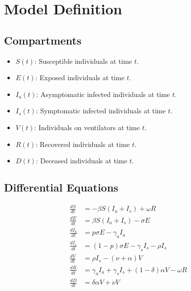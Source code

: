 \documentclass[lettersize, journal]{IEEEtran}
\begin{document}
\section{Model Definition}
\subsection{Compartments}
\begin{itemize}
    \item \( S(t) \): Susceptible individuals at time \( t \).
    \item \( E(t) \): Exposed individuals at time \( t \).
    \item \( I_a(t) \): Asymptomatic infected individuals at time \( t \).
    \item \( I_s(t) \): Symptomatic infected individuals at time \( t \).
    \item \( V(t) \): Individuals on ventilators at time \( t \).
    \item \( R(t) \): Recovered individuals at time \( t \).
    \item \( D(t) \): Deceased individuals at time \( t \).
\end{itemize}

\subsection{Differential Equations}
\begin{align*}
\frac{dS}{dt} & = -\beta S (I_a + I_s) + \omega R \\
\frac{dE}{dt} & = \beta S (I_a + I_s) - \sigma E \\
\frac{dI_a}{dt} & = p \sigma E - \gamma_a I_a \\
\frac{dI_s}{dt} & = (1-p) \sigma E - \gamma_s I_s - \rho I_s \\
\frac{dV}{dt} & = \rho I_s - (\nu + \alpha) V \\
\frac{dR}{dt} & = \gamma_a I_a + \gamma_s I_s + (1-\delta) \alpha V - \omega R \\
\frac{dD}{dt} & = \delta \alpha V + \nu V
\end{align*}
\end{document}
